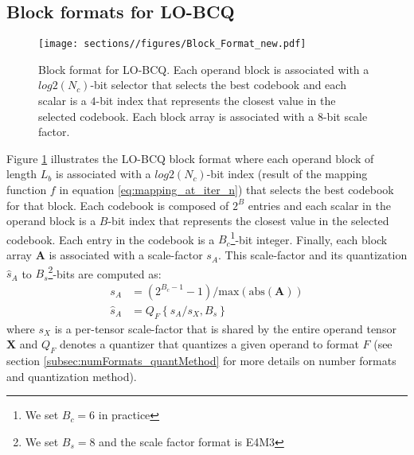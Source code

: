 

\subsection{Block formats for LO-BCQ}
\begin{figure}
    \centering
    \texttt{[image: sections//figures/Block\_Format\_new.pdf]}
    \caption{\small Block format for LO-BCQ. Each operand block is associated with a $log2(N_c)$-bit selector that selects the best codebook and each scalar is a $4$-bit index that represents the closest value in the selected codebook. Each block array is associated with a $8$-bit scale factor.}
    \label{fig:lobcq_format}
    \vspace{-8pt}
\end{figure}

Figure \ref{fig:lobcq_format} illustrates the LO-BCQ block format where each operand block of length $L_b$ is associated with a $log2(N_c)$-bit index (result of the mapping function $f$ in equation \ref{eq:mapping_at_iter_n}) that selects the best codebook for that block. Each codebook is composed of $2^B$ entries and each scalar in the operand block is a $B$-bit index that represents the closest value in the selected codebook. Each entry in the codebook is a $B_c$\footnote{We set $B_c=6$ in practice}-bit integer. Finally, each block array $\bm{A}$ is associated with a scale-factor $s_A$. This scale-factor and its quantization $\hat{s}_A$ to $B_s$\footnote{We set $B_s=8$ and the scale factor format is E4M3}-bits are computed as:
\begin{align}
    \label{eq:blockArray scale}
    s_A & = {\left(2^{B_c - 1} - 1\right)}/{\text{max}(\text{abs}(\bm{A}))} \\
    \hat{s}_A & = Q_{F}\left\{{s_A}/{s_X}, B_s\right\}
\end{align}
where $s_X$ is a per-tensor scale-factor that is shared by the entire operand tensor $\bm{X}$ and $Q_{F}$ denotes a quantizer that quantizes a given operand to format $F$ (see section \ref{subsec:numFormats_quantMethod} for more details on number formats and quantization method). 

